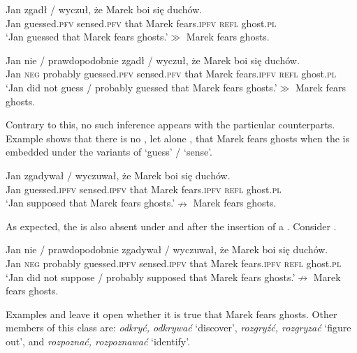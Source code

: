 \documentclass[output=paper,  modfonts,  newtxmath,  hidelinks		  ]{langscibook}
\begin{document}
\ea\label{21:13}
\gll Jan zgadł / wyczuł, że Marek boi się duchów.\\
Jan guessed.\textsc{pfv} {} sensed.\textsc{pfv} that Marek fears.\textsc{ipfv} \textsc{refl} ghost.\textsc{pl}\\
\glt	`Jan guessed that Marek fears ghosts.'\newline$\gg$ Marek fears ghosts.
\z

\ea\label{21:14}
\gll Jan nie / prawdopodobnie zgadł / wyczuł, że Marek boi się duchów.\\
Jan \textsc{neg} {} probably guessed.\textsc{pfv} {} sensed.\textsc{pfv} that Marek fears.\textsc{ipfv} \textsc{refl} ghost.\textsc{pl}\\
\glt	`Jan did not guess / probably guessed that Marek fears ghosts.'\newline$\gg$ Marek fears ghosts.
\z

\noindent Contrary to this, no such inference appears with the particular  counterparts. Example  shows that there is no , let alone , that Marek fears ghosts when the  is embedded under the  variants of `guess’ / `sense’.

\ea\label{21:15}
\gll Jan zgadywał / wyczuwał, że Marek boi się duchów.\\
Jan guessed.\textsc{ipfv} {} sensed.\textsc{ipfv} that Marek fears.\textsc{ipfv} \textsc{refl} ghost.\textsc{pl}\\
\glt	`Jan supposed that Marek fears ghosts.'\newline$\nrightarrow$  Marek fears ghosts.
\z

\noindent As expected, the  is also absent under  and after the insertion of a . Consider .

\ea\label{21:16}
\gll Jan nie / prawdopodobnie zgadywał / wyczuwał, że Marek boi się duchów.\\
Jan \textsc{neg} {} probably guessed.\textsc{ipfv} {} sensed.\textsc{ipfv} that Marek fears.\textsc{ipfv} \textsc{refl} ghost.\textsc{pl}\\
\glt	`Jan did not suppose / probably supposed that Marek fears ghosts.'\newline$\nrightarrow$  Marek fears ghosts.
\z

\noindent Examples  and  leave it open whether it is true that Marek fears ghosts. Other members of this class are: \textit{odkryć, odkrywać} `discover’, \textit{rozgryźć, rozgryzać} `figure out’, and \textit{rozpoznać, rozpoznawać} `identify’.
\end{document}
